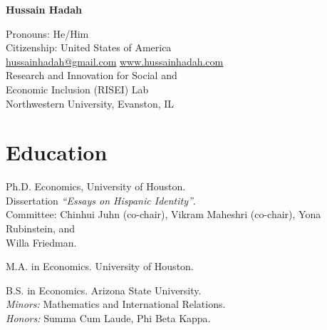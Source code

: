 \documentclass[letterpaper]{article}
\def\name{Hussain Hadah}
\renewenvironment{itemize}{
  \begin{list}{}{
    \setlength{\leftmargin}{1.5em}
  }
}{
  \end{list}
}
\begin{document}
\centerline{\huge \bf \name}

\begin{center}
   \hspace{0.5mm} Pronouns: He/Him \href{https://www.mypronouns.org/}{\faQuestionCircleO}  
\\    
\hspace{0.5mm} Citizenship: United States of America
\\
\faEnvelopeO \hspace{0.5mm} \href{mailto:hussainhadah@gmail.com}{hussainhadah@gmail.com} \rm  \hspace{0.5mm} \faGlobe \hspace{0.5mm} \href{https://www.hussainhadah.com/}{www.hussainhadah.com} 
\href{https://www.linkedin.com/in/hussain-hadah/}{\faLinkedinSquare} \href{https://github.com/hhadah}{\faGithub} 
\\ Research and Innovation for Social and \\
Economic Inclusion (RISEI) Lab \\
Northwestern University, Evanston, IL\\
  
\end{center}


\section*{Education}
\vspace{2 mm}
\begin{itemize}
  \item {}Ph.D. Economics, University of Houston. \\{\makebox[1.8cm]{\hfill}}Dissertation \textit{“Essays on Hispanic Identity”}. \\{\makebox[1.8cm]{\hfill}}Committee: Chinhui Juhn (co-chair), Vikram Maheshri (co-chair), Yona Rubinstein, and \\{\makebox[1.8cm]{\hfill}}Willa Friedman.
  \item {}M.A. in Economics. University of Houston. 
  \item {}B.S. in Economics.  Arizona State University. \\{\makebox[1.8cm]{\hfill}}\textit{Minors:} Mathematics and International Relations. \\{\makebox[1.8cm]{\hfill}}\textit{Honors:} Summa Cum Laude, Phi Beta Kappa.
\end{itemize}
\vspace{2 mm}
\end{document}
